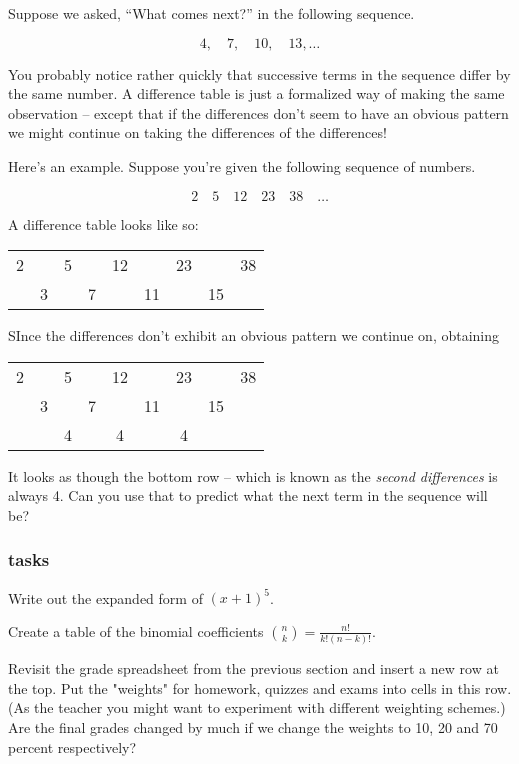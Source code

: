 Suppose we asked, ``What comes next?'' in the following sequence.
 
 \[ 4, \quad 7, \quad 10, \quad 13, \ldots \]
 
 You probably notice rather quickly that successive terms in the sequence differ by the same number.  A difference table is just a formalized way of making the same observation -- except that if the differences don't seem to have an obvious pattern we might continue on taking the differences of the differences!
 
 Here's an example.  Suppose you're given the following sequence of numbers.
 
 \[ 2 \quad 5 \quad 12 \quad 23 \quad 38 \quad \ldots \]
 
 A difference table looks like so:
 
 \begin{tabular}{ccccccccc}
 	2 &  & 5 & & 12 & & 23 & & 38 \\
 	   & 3 & & 7 & & 11 & & 15 
 \end{tabular}

SInce the differences don't exhibit an obvious pattern we continue on, obtaining

\begin{tabular}{ccccccccc}
	2 &  & 5 & & 12 & & 23 & & 38 \\
	& 3 & & 7 & & 11 & & 15 & \\
	& & 4 &  & 4  &  & 4 & & \\ 
\end{tabular}

It looks as though the bottom row -- which is known as the {\em second differences} is always 4.  Can you use that to predict what the next term in the sequence will be?

\subsubsection{tasks}

Write out the expanded form of $(x+1)^5$.

Create a table of the binomial coefficients $\binom{n}{k} = \frac{n!}{k!(n-k)!}$.

Revisit the grade spreadsheet from the previous section and insert a new row at the top.  Put the "weights" for homework, 
quizzes and exams into cells in this row.  (As the teacher you might want to experiment with different 
weighting schemes.) Are the final grades changed by much if we change the weights to 10, 
20 and 70 percent respectively?


